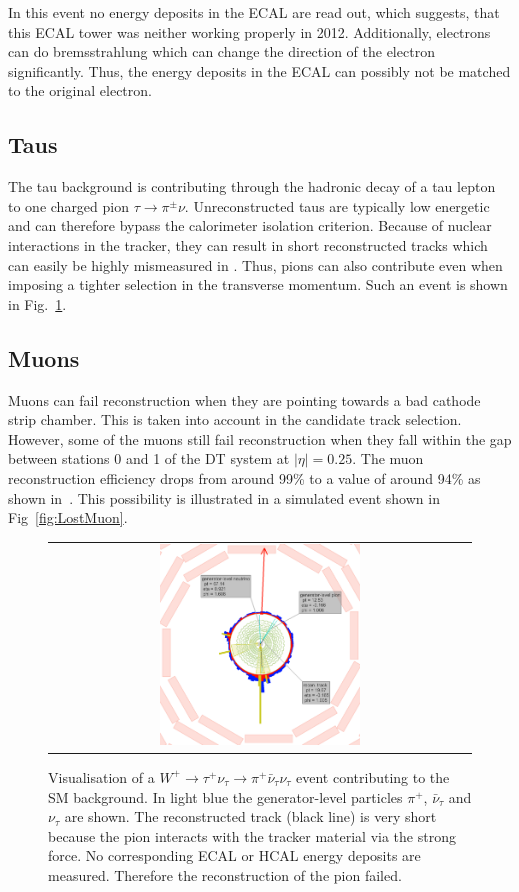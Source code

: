 In this event no energy deposits in the ECAL are read out, which suggests, that this ECAL tower was neither working properly in 2012.
Additionally, electrons can do bremsstrahlung which can change the direction of the electron significantly.
Thus, the energy deposits in the ECAL can possibly not be matched to the original electron.


\subsection*{Taus}
The tau background is contributing through the hadronic decay of a tau lepton to one charged pion $\tau\rightarrow\pi^{\pm}\nu$.
Unreconstructed taus are typically low energetic and can therefore bypass the calorimeter isolation criterion.
Because of nuclear interactions in the tracker, they can result in short reconstructed tracks which can easily be highly mismeasured in \pt.
Thus, pions can also contribute even when imposing a tighter selection in the transverse momentum.
Such an event is shown in Fig.~\ref{fig:LostTau}.


\subsection*{Muons}
Muons can fail reconstruction when they are pointing towards a bad cathode strip chamber.
This is taken into account in the candidate track selection.
However, some of the muons still fail reconstruction when they fall within the gap between stations 0 and 1 of the DT system at $|\eta|=0.25$.
The muon reconstruction efficiency drops from around 99\% to a value of around 94\% as shown in~\cite{bib:CMS:DT_Thesis,bib:CMS:DT_8TeV_AN}.
This possibility is illustrated in a simulated event shown in Fig~\ref{fig:LostMuon}.
\begin{figure}[!tb]
  \centering 
  \begin{tabular}{c}
    \includegraphics[width=0.49\textwidth]{figures/analysis/LostTau_Lumi_60133_Event_24033837.png}
  \end{tabular}
  \caption{Visualisation of a $W^{+}\rightarrow \tau^{+}\nu_{\tau} \rightarrow \pi^{+}\bar{\nu}_{\tau} \nu_{\tau} $ event contributing to the SM background. 
           In light blue the generator-level particles $\pi^{+}$, $\bar{\nu}_{\tau}$ and $\nu_{\tau}$ are shown.
           The reconstructed track (black line) is very short because the pion interacts with the tracker material via the strong force.
           No corresponding ECAL or HCAL energy deposits are measured. Therefore the reconstruction of the pion failed.}
  \label{fig:LostTau}
\end{figure}

